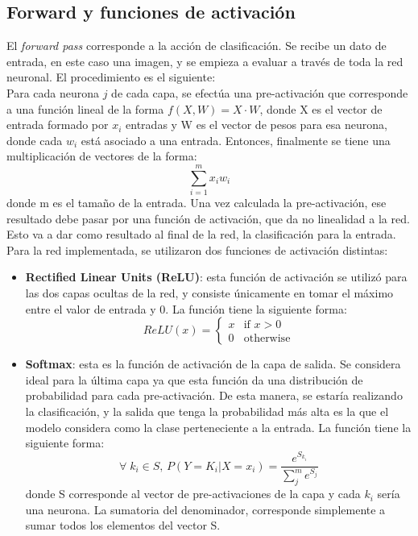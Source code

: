 \documentclass[journal]{IEEEtran}
\begin{document}
\subsection{Forward y funciones de activación}
El \textit{forward pass} corresponde a la acción de clasificación. Se recibe un dato de entrada, en este caso una imagen, y se empieza a evaluar a través de toda la red neuronal. El procedimiento es el siguiente:\\
Para cada neurona $j$ de cada capa, se efectúa una pre-activación que corresponde a una función lineal de la forma \(f(X,W) = X\cdot W\), donde X es el vector de entrada formado por $x_i$ entradas y W es el vector de pesos para esa neurona, donde cada $w_i$ está asociado a una entrada. Entonces, finalmente se tiene una multiplicación de vectores de la forma: 
\begin{equation}\label{eq:linear}
    \sum_{i=1}^{m} x_i w_i
\end{equation}donde m es el tamaño de la entrada. Una vez calculada la pre-activación, ese resultado debe pasar por una función de activación, que da no linealidad a la red. Esto va a dar como resultado al final de la red, la clasificación para la entrada. Para la red implementada, se utilizaron dos funciones de activación distintas:
\begin{itemize}
    \item \textbf{Rectified Linear Units (ReLU)}: esta función de activación se utilizó para las dos capas ocultas de la red, y consiste únicamente en tomar el máximo entre el valor de entrada y 0. La función tiene la siguiente forma: 
    \begin{equation}\label{eq:relu}
        ReLU(x) = 
        \begin{cases}
        x & \text{if } x>0\\
        0 & \text{otherwise}
        \end{cases}
    \end{equation}
    \item \textbf{Softmax}: esta es la función de activación de la capa de salida. Se considera ideal para la última capa ya que esta función da una distribución de probabilidad para cada pre-activación. De esta manera, se estaría realizando la clasificación, y la salida que tenga la probabilidad más alta es la que el modelo considera como la clase perteneciente a la entrada. La función tiene la siguiente forma:
    \begin{equation}\label{eq:softmax}
        \forall \; k_i \in S\text{, }P(Y=K_i|X=x_i) = \frac{e^{S_{k_i}}}{\sum_{j}^{m} e^{S_j}}
    \end{equation}
    donde S corresponde al vector de pre-activaciones de la capa y cada $k_i$ sería una neurona. La sumatoria del denominador, corresponde simplemente a sumar todos los elementos del vector S.
\end{itemize}
\end{document}
